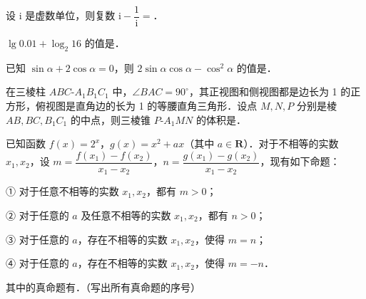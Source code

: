 \begin{question}
设 \(\mathrm{i}\) 是虚数单位，则复数 \(\mathrm{i}-\dfrac{1}{\mathrm{i}}=\)\gkblank{}．

\end{question}
\begin{question}
\(\lg 0.01+\log_2 16\) 的值是\gkblank{}．

\end{question}
\begin{question}
已知 \(\sin\alpha+2\cos\alpha=0\)，则 \(2\sin\alpha\cos\alpha-\cos^2\alpha\) 的值是\gkblank{}．

\end{question}
\begin{question}
在三棱柱 \(ABC\text{-}A_1B_1C_1\) 中，\(\angle BAC=90^{\circ}\)，其正视图和侧视图都是边长为 1 的正方形，俯视图是直角边的长为 1 的等腰直角三角形．设点 \(M,N,P\) 分别是棱 \(AB,BC,B_1C_1\) 的中点，则三棱锥 \(P\text{-}A_1MN\) 的体积是\gkblank{}．

\end{question}
\begin{question}
已知函数 \(f(x)=2^x\)，\(g(x)=x^2+ax\)（其中 \(a\in\mathbf{R}\)）．对于不相等的实数 \(x_1,x_2\)，设 \(m=\dfrac{f(x_1)-f(x_2)}{x_1-x_2}\)，\(n=\dfrac{g(x_1)-g(x_2)}{x_1-x_2}\)，现有如下命题：

① 对于任意不相等的实数 \(x_1,x_2\)，都有 \(m>0\)；

② 对于任意的 \(a\) 及任意不相等的实数 \(x_1,x_2\)，都有 \(n>0\)；

③ 对于任意的 \(a\)，存在不相等的实数 \(x_1,x_2\)，使得 \(m=n\)；

④ 对于任意的 \(a\)，存在不相等的实数 \(x_1,x_2\)，使得 \(m=-n\)．

其中的真命题有\gkblank{}．（写出所有真命题的序号）

\end{question}


